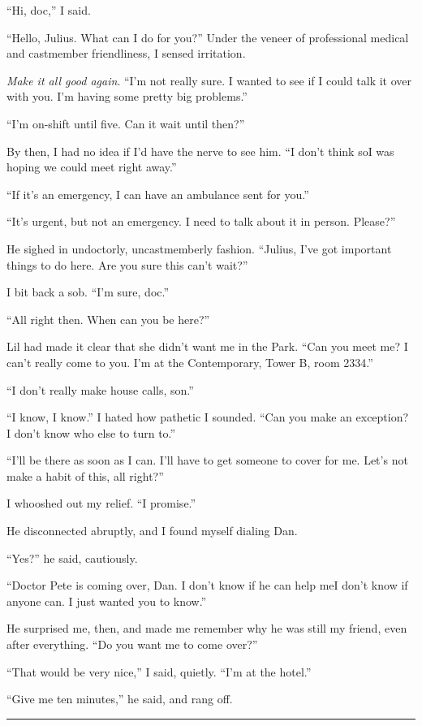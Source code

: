 “Hi, doc,” I said.

“Hello, Julius. What can I do for you?” Under the veneer of
professional medical and castmember friendliness, I sensed
irritation.

\emph{Make it all good again}. “I'm not really sure. I wanted to
see if I could talk it over with you. I'm having some pretty big
problems.”

“I'm on-shift until five. Can it wait until then?”

By then, I had no idea if I'd have the nerve to see him. “I don't
think so{\dash}I was hoping we could meet right away.”

“If it's an emergency, I can have an ambulance sent for you.”

“It's urgent, but not an emergency. I need to talk about it in
person. Please?”

He sighed in undoctorly, uncastmemberly fashion. “Julius, I've got
important things to do here. Are you sure this can't wait?”

I bit back a sob. “I'm sure, doc.”

“All right then. When can you be here?”

Lil had made it clear that she didn't want me in the Park. “Can you
meet me? I can't really come to you. I'm at the Contemporary, Tower
B, room 2334.”

“I don't really make house calls, son.”

“I know, I know.” I hated how pathetic I sounded. “Can you make an
exception? I don't know who else to turn to.”

“I'll be there as soon as I can. I'll have to get someone to cover
for me. Let's not make a habit of this, all right?”

I whooshed out my relief. “I promise.”

He disconnected abruptly, and I found myself dialing Dan.

“Yes?” he said, cautiously.

“Doctor Pete is coming over, Dan. I don't know if he can help me{\dash}I
don't know if anyone can. I just wanted you to know.”

He surprised me, then, and made me remember why he was still my
friend, even after everything. “Do you want me to come over?”

“That would be very nice,” I said, quietly. “I'm at the hotel.”

“Give me ten minutes,” he said, and rang off.

\begin{center}\rule{1in}{0.4pt}\end{center}

